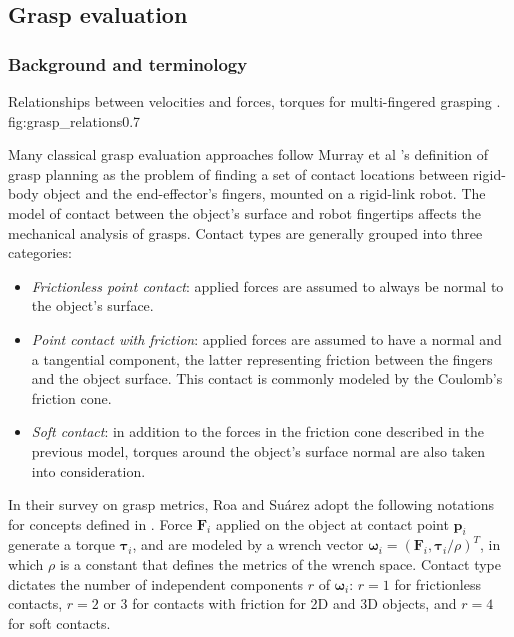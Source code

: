 \subsection{Grasp evaluation}

\subsubsection*{Background and terminology}
{Relationships between velocities and forces, torques for multi-fingered grasping \cite{Roa2015}.}
{fig:grasp_relations}{0.7\textwidth}

Many classical grasp evaluation approaches follow Murray et al \cite{Murray1994}'s definition of grasp planning as the
problem of finding a set of contact locations between rigid-body object and the end-effector's fingers, mounted on a
rigid-link robot. The model of contact between the object's surface and robot fingertips affects the mechanical analysis
of grasps. Contact types are generally grouped into three categories:
\begin{itemize}
    \item \emph{Frictionless point contact}: applied forces are assumed to always be normal to the object's surface.
    \item \emph{Point contact with friction}: applied forces are assumed to have a normal and a tangential component,
    the latter representing friction between the fingers and the object surface. This contact is commonly modeled by
    the Coulomb's friction cone.
    \item \emph{Soft contact}: in addition to the forces in the friction cone described in the previous model, torques
    around the object's surface normal are also taken into consideration.
\end{itemize}

In their survey on grasp metrics, Roa and Su{\'a}rez \cite{Roa2015} adopt the following notations for concepts defined
in \cite{Murray1994}. Force $ \boldsymbol{F}_i $ applied on the object at contact point $ \boldsymbol{p}_i $ generate a
torque $ \boldsymbol{\tau}_i $, and are modeled by a wrench vector
$ \boldsymbol{\omega}_i = (\boldsymbol{F}_i, \boldsymbol{\tau}_i/\rho)^T $, in which $ \rho $ is a constant that defines
the metrics of the wrench space. Contact type dictates the number of independent components $ r $ of
$ \boldsymbol{\omega}_i $: $ r=1 $ for frictionless contacts, $ r = 2 $ or $ 3 $ for contacts with friction for 2D and 3D
objects, and $ r = 4 $ for soft contacts.


